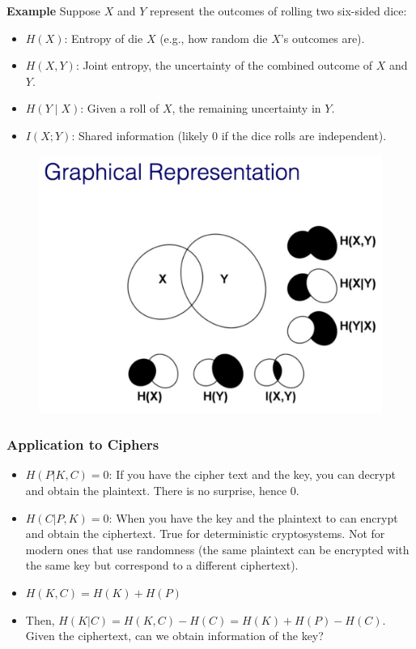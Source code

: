 \textbf{Example}
Suppose \( X \) and \( Y \) represent the outcomes of rolling two six-sided dice:
\begin{itemize}
    \item \( H(X) \): Entropy of die \( X \) (e.g., how random die \( X \)'s outcomes are).
    \item \( H(X, Y) \): Joint entropy, the uncertainty of the combined outcome of \( X \) and \( Y \).
    \item \( H(Y \mid X) \): Given a roll of \( X \), the remaining uncertainty in \( Y \).
    \item \( I(X; Y) \): Shared information (likely 0 if the dice rolls are independent).
\end{itemize}

\begin{figure}[h!]
    \centering
    \includegraphics[scale=0.4]{img/entropy.png}
\end{figure}

\subsubsection{Application to Ciphers}
\begin{itemize}
    \item $H(P|K,C) = 0$: If you have the cipher text and the key, you can decrypt and obtain the plaintext. There is no surprise, hence 0.
    \item $H(C|P,K) = 0$: When you have the key and the plaintext to can encrypt and obtain the ciphertext. True for deterministic cryptosystems. Not for modern ones that use randomness (the same plaintext can be encrypted with the same key but correspond to a different ciphertext).
    \item $H(K,C) = H(K) + H(P)$
    \item Then, $H(K|C) = H(K,C) - H(C) = H(K)+H(P)-H(C)$. Given the ciphertext, can we obtain information of the key?
\end{itemize}


